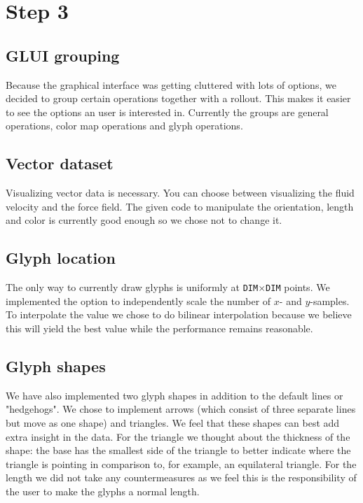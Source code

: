 \section*{Step 3}
 \subsection*{GLUI grouping}
 Because the graphical interface was getting cluttered with lots of options, we decided to group certain operations together with a rollout. This makes it easier to see the options an user is interested in. Currently the groups are general operations, color map operations and glyph operations.
 \subsection*{Vector dataset}
 Visualizing vector data is necessary. You can choose between visualizing the fluid velocity and the force field. The given code to manipulate the orientation, length and color is currently good enough so we chose not to change it. 
 \subsection*{Glyph location}
 The only way to currently draw glyphs is uniformly at \texttt{DIM}$\times$\texttt{DIM} points. We implemented the option to independently scale the number of $x$- and $y$-samples. To interpolate the value we chose to do bilinear interpolation because we believe this will yield the best value while the performance remains reasonable.
 \subsection*{Glyph shapes}
 We have also implemented two glyph shapes in addition to the default lines or "hedgehogs". We chose to implement arrows (which consist of three separate lines but move as one shape) and triangles. We feel that these shapes can best add extra insight in the data. For the triangle we thought about the thickness of the shape: the base has the smallest side of the triangle to better indicate where the triangle is pointing in comparison to, for example, an equilateral triangle. For the length we did not take any countermeasures as we feel this is the responsibility of the user to make the glyphs a normal length. 
